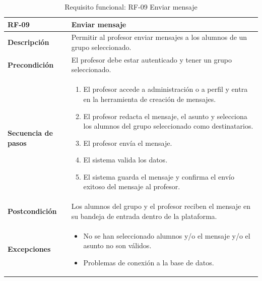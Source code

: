\begin{table}[H]
\centering
\begin{tabularx}{\textwidth}{
  |>{\centering\arraybackslash}l
  |>{\centering\arraybackslash}X|}
\hline
\textbf{RF-09} & \textbf{Enviar mensaje} \\ \hline

\textbf{Descripción} & Permitir al profesor enviar mensajes a los alumnos de un grupo seleccionado. \\ \hline

\textbf{Precondición} & El profesor debe estar autenticado y tener un grupo seleccionado. \\ \hline

\textbf{Secuencia de pasos} & 
\begin{enumerate}
  \item El profesor accede a administración o a perfil y entra en la herramienta de creación de mensajes.
  \item El profesor redacta el mensaje, el asunto y selecciona los alumnos del grupo seleccionado como destinatarios.
  \item El profesor envía el mensaje.
  \item El sistema valida los datos.
  \item El sistema guarda el mensaje y confirma el envío exitoso del mensaje al profesor.
\end{enumerate} \\ \hline

\textbf{Postcondición} & Los alumnos del grupo y el profesor reciben el mensaje en su bandeja de entrada dentro de la plataforma. \\ \hline

\textbf{Excepciones} & 
\begin{itemize}
  \item No se han seleccionado alumnos y/o el mensaje y/o el asunto no son válidos.
  \item Problemas de conexión a la base de datos.
\end{itemize} \\ \hline
\end{tabularx}
\caption{Requisito funcional: RF-09 Enviar mensaje}
\end{table}
